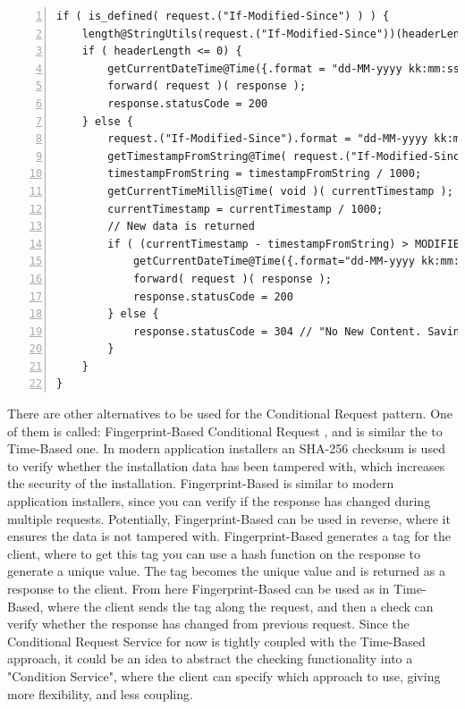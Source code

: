 \documentclass[12pt]{article}
\begin{document}
\begin{lstlisting}[caption=Courier operations for the Conditional Request service, 
    captionpos=b, label={lst:condreqCourier}, frame=single, breaklines=true, numbers=left, basicstyle=\scriptsize]
if ( is_defined( request.("If-Modified-Since") ) ) {
    length@StringUtils(request.("If-Modified-Since"))(headerLength);
    if ( headerLength <= 0) {
        getCurrentDateTime@Time({.format = "dd-MM-yyyy kk:mm:ss"})(lastModified);
        forward( request )( response );
        response.statusCode = 200
    } else {
        request.("If-Modified-Since").format = "dd-MM-yyyy kk:mm:ss";
        getTimestampFromString@Time( request.("If-Modified-Since") )( timestampFromString );
        timestampFromString = timestampFromString / 1000;
        getCurrentTimeMillis@Time( void )( currentTimestamp );
        currentTimestamp = currentTimestamp / 1000;
        // New data is returned
        if ( (currentTimestamp - timestampFromString) > MODIFIED_TIMESTAMP ) {
            getCurrentDateTime@Time({.format="dd-MM-yyyy kk:mm:ss"})(lastModified);
            forward( request )( response );
            response.statusCode = 200
        } else {
            response.statusCode = 304 // "No New Content. Saving Bandwidth";
        }
    }
}
\end{lstlisting}

There are other alternatives to be used for the Conditional Request pattern. One of them is called: Fingerprint-Based Conditional Request \cite{CondReqRFC}, and is similar the to Time-Based one. In modern application installers an SHA-256 checksum \cite{ChecksumRFC} is used to verify whether the installation data has been tampered with, which increases the security of the installation. Fingerprint-Based is similar to modern application installers, since you can verify if the response has changed during multiple requests. Potentially, Fingerprint-Based can be used in reverse, where it ensures the data is not tampered with. Fingerprint-Based generates a tag for the client, where to get this tag you can use a hash function on the response to generate a unique value. The tag becomes the unique value and is returned as a response to the client. From here Fingerprint-Based can be used as in Time-Based, where the client sends the tag along the request, and then a check can verify whether the response has changed from previous request. Since the Conditional Request Service for now is tightly coupled with the Time-Based approach, it could be an idea to abstract the checking functionality into a "Condition Service", where the client can specify which approach to use, giving more flexibility, and less coupling. \\
\end{document}
